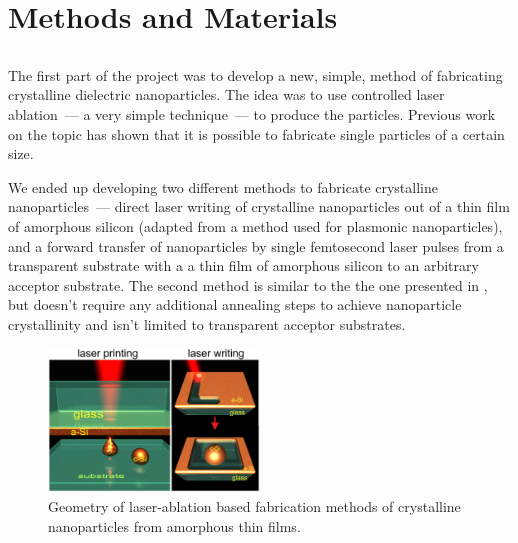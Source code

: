 \section{Methods and Materials}
\label{ch:Exp}

    \subsection{}
    \label{sec:Ablation}
            The first part of the project was to develop a new, simple, method of fabricating crystalline dielectric
        nanoparticles. The idea was to use controlled laser ablation~--- a very simple technique~--- to produce the particles.
        Previous work on the topic\cite{kuznetsov2012magnetic, zywietz2014laser} has shown that it is possible to fabricate single particles
        of a certain size.

            We ended up developing two different methods to fabricate crystalline nanoparticles~--- direct laser writing of crystalline
        nanoparticles out of a thin film of amorphous silicon (adapted from a method used for plasmonic nanoparticles\cite{makarov2016controllable,
        dmitriev2016direct}), and a forward transfer of nanoparticles by single femtosecond laser pulses
        from a transparent substrate with a a thin film of amorphous silicon to an arbitrary acceptor substrate. The second method is
        similar to the the one presented in \cite{zywietz2014laser}, but doesn't require any additional annealing steps to achieve
        nanoparticle crystallinity and isn't limited to transparent acceptor substrates.

        \begin{figure}[h!]
                \begin{center}
                    \includegraphics[width=0.5\textwidth]{figs/methods/LaserPrinting.eps}
                \end{center}
                \caption{Geometry of laser-ablation based fabrication methods of crystalline nanoparticles from amorphous
                            thin films.}
                \label{fig:LaserPrinting}                            
        \end{figure}

